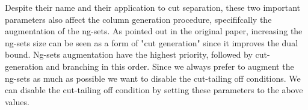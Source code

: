 \begin{itemize}
	      Despite their name and their application to cut separation, these two important
	      parameters also affect the column generation procedure, specififcally the augmentation of the ng-sets.
	      As pointed out in the original paper,
	      increasing the ng-sets size can be seen as a form of "cut generation"
	      since it improves the dual bound.
	      Ng-sets augmentation have the highest priority, followed by cut-generation and branching in this order.
	      Since we always prefer to augment the ng-sets as much as possible we want
	      to disable the cut-tailing off conditions.
	      We can disable the cut-tailing off condition by setting these parameters to the above values.
\end{itemize}

\begin{comment}
[ About what is reduced cost fixing ]
[ Bucket arc elimination procedure = Reduced cost fixing procedure]
\textcite{sadykov2021}
VRPSolver extension includes an implementation of the pricing functor which
allows the user to define the subproblems as resource constrained shortest path
problems in graphs. The functor implements the bucket-graph based labeling
algorithm from paper [16] for solving the pricing problem, as well as the corre-
sponding bucket arc elimination procedure (i.e. reduced cost fixing procedure),
and the elementary route enumeration procedure [1]. VRPSolver extension also
implements cut separation functors for rounded cap
\end{comment}

